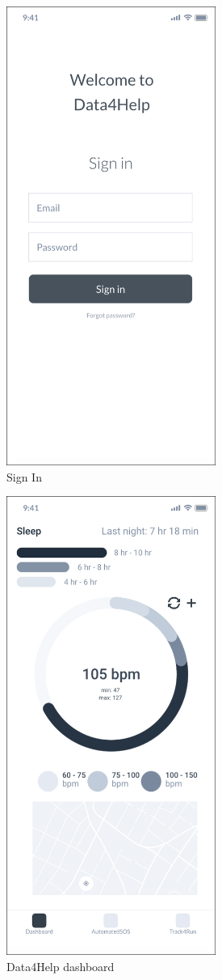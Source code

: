 \documentclass{article}
\begin{document}
	\begin{figure}[!h]
	 	\centering
		\includegraphics[height=15cm,keepaspectratio]{Figures/2SignIn}
		\caption{Sign In}
	\end{figure}\newpage
	
	\begin{figure}[!h]
	 	\centering
		\includegraphics[height=15cm,keepaspectratio]{Figures/3Dashboard}
		\caption{Data4Help dashboard}
	\end{figure}\newpage
	
\end{document}
